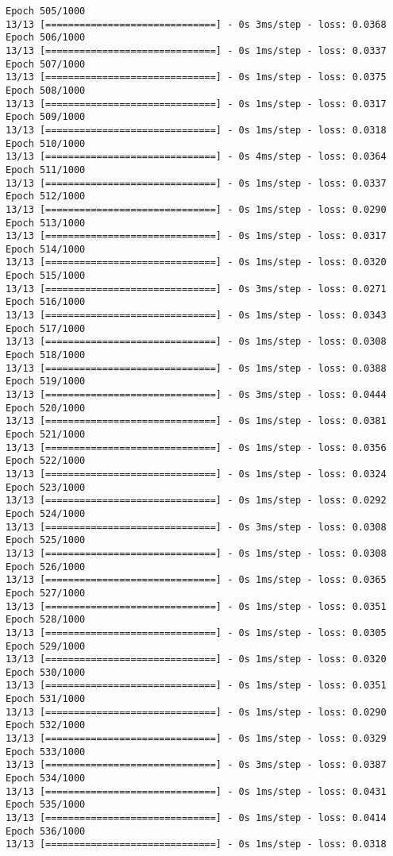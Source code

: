 \documentclass[11pt]{article}
\begin{document}
\begin{Verbatim}[commandchars=\\\{\}]
Epoch 505/1000
13/13 [==============================] - 0s 3ms/step - loss: 0.0368
Epoch 506/1000
13/13 [==============================] - 0s 1ms/step - loss: 0.0337
Epoch 507/1000
13/13 [==============================] - 0s 1ms/step - loss: 0.0375
Epoch 508/1000
13/13 [==============================] - 0s 1ms/step - loss: 0.0317
Epoch 509/1000
13/13 [==============================] - 0s 1ms/step - loss: 0.0318
Epoch 510/1000
13/13 [==============================] - 0s 4ms/step - loss: 0.0364
Epoch 511/1000
13/13 [==============================] - 0s 1ms/step - loss: 0.0337
Epoch 512/1000
13/13 [==============================] - 0s 1ms/step - loss: 0.0290
Epoch 513/1000
13/13 [==============================] - 0s 1ms/step - loss: 0.0317
Epoch 514/1000
13/13 [==============================] - 0s 1ms/step - loss: 0.0320
Epoch 515/1000
13/13 [==============================] - 0s 3ms/step - loss: 0.0271
Epoch 516/1000
13/13 [==============================] - 0s 1ms/step - loss: 0.0343
Epoch 517/1000
13/13 [==============================] - 0s 1ms/step - loss: 0.0308
Epoch 518/1000
13/13 [==============================] - 0s 1ms/step - loss: 0.0388
Epoch 519/1000
13/13 [==============================] - 0s 3ms/step - loss: 0.0444
Epoch 520/1000
13/13 [==============================] - 0s 1ms/step - loss: 0.0381
Epoch 521/1000
13/13 [==============================] - 0s 1ms/step - loss: 0.0356
Epoch 522/1000
13/13 [==============================] - 0s 1ms/step - loss: 0.0324
Epoch 523/1000
13/13 [==============================] - 0s 1ms/step - loss: 0.0292
Epoch 524/1000
13/13 [==============================] - 0s 3ms/step - loss: 0.0308
Epoch 525/1000
13/13 [==============================] - 0s 1ms/step - loss: 0.0308
Epoch 526/1000
13/13 [==============================] - 0s 1ms/step - loss: 0.0365
Epoch 527/1000
13/13 [==============================] - 0s 1ms/step - loss: 0.0351
Epoch 528/1000
13/13 [==============================] - 0s 1ms/step - loss: 0.0305
Epoch 529/1000
13/13 [==============================] - 0s 1ms/step - loss: 0.0320
Epoch 530/1000
13/13 [==============================] - 0s 1ms/step - loss: 0.0351
Epoch 531/1000
13/13 [==============================] - 0s 1ms/step - loss: 0.0290
Epoch 532/1000
13/13 [==============================] - 0s 1ms/step - loss: 0.0329
Epoch 533/1000
13/13 [==============================] - 0s 3ms/step - loss: 0.0387
Epoch 534/1000
13/13 [==============================] - 0s 1ms/step - loss: 0.0431
Epoch 535/1000
13/13 [==============================] - 0s 1ms/step - loss: 0.0414
Epoch 536/1000
13/13 [==============================] - 0s 1ms/step - loss: 0.0318

\end{Verbatim}
\end{document}
